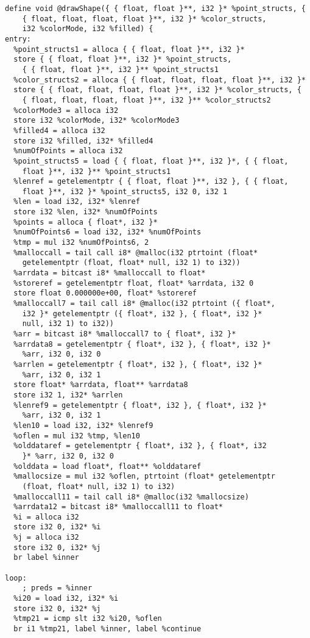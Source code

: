 \documentclass[main.tex]{subfiles}
\begin{document}
{\begin{lstlisting}
define void @drawShape({ { float, float }**, i32 }* %point_structs, { 
    { float, float, float, float }**, i32 }* %color_structs,
    i32 %colorMode, i32 %filled) {
entry:
  %point_structs1 = alloca { { float, float }**, i32 }*
  store { { float, float }**, i32 }* %point_structs,
    { { float, float }**, i32 }** %point_structs1
  %color_structs2 = alloca { { float, float, float, float }**, i32 }*
  store { { float, float, float, float }**, i32 }* %color_structs, { 
    { float, float, float, float }**, i32 }** %color_structs2
  %colorMode3 = alloca i32
  store i32 %colorMode, i32* %colorMode3
  %filled4 = alloca i32
  store i32 %filled, i32* %filled4
  %numOfPoints = alloca i32
  %point_structs5 = load { { float, float }**, i32 }*, { { float, 
    float }**, i32 }** %point_structs1
  %lenref = getelementptr { { float, float }**, i32 }, { { float, 
    float }**, i32 }* %point_structs5, i32 0, i32 1
  %len = load i32, i32* %lenref
  store i32 %len, i32* %numOfPoints
  %points = alloca { float*, i32 }*
  %numOfPoints6 = load i32, i32* %numOfPoints
  %tmp = mul i32 %numOfPoints6, 2
  %malloccall = tail call i8* @malloc(i32 ptrtoint (float* 
    getelementptr (float, float* null, i32 1) to i32))
  %arrdata = bitcast i8* %malloccall to float*
  %storeref = getelementptr float, float* %arrdata, i32 0
  store float 0.000000e+00, float* %storeref
  %malloccall7 = tail call i8* @malloc(i32 ptrtoint ({ float*, 
    i32 }* getelementptr ({ float*, i32 }, { float*, i32 }* 
    null, i32 1) to i32))
  %arr = bitcast i8* %malloccall7 to { float*, i32 }*
  %arrdata8 = getelementptr { float*, i32 }, { float*, i32 }*
    %arr, i32 0, i32 0
  %arrlen = getelementptr { float*, i32 }, { float*, i32 }*
    %arr, i32 0, i32 1
  store float* %arrdata, float** %arrdata8
  store i32 1, i32* %arrlen
  %lenref9 = getelementptr { float*, i32 }, { float*, i32 }*
    %arr, i32 0, i32 1
  %len10 = load i32, i32* %lenref9
  %oflen = mul i32 %tmp, %len10
  %olddataref = getelementptr { float*, i32 }, { float*, i32
    }* %arr, i32 0, i32 0
  %olddata = load float*, float** %olddataref
  %mallocsize = mul i32 %oflen, ptrtoint (float* getelementptr 
    (float, float* null, i32 1) to i32)
  %malloccall11 = tail call i8* @malloc(i32 %mallocsize)
  %arrdata12 = bitcast i8* %malloccall11 to float*
  %i = alloca i32
  store i32 0, i32* %i
  %j = alloca i32
  store i32 0, i32* %j
  br label %inner

loop:                                             
    ; preds = %inner
  %i20 = load i32, i32* %i
  store i32 0, i32* %j
  %tmp21 = icmp slt i32 %i20, %oflen
  br i1 %tmp21, label %inner, label %continue


\end{lstlisting}}
\end{document}
